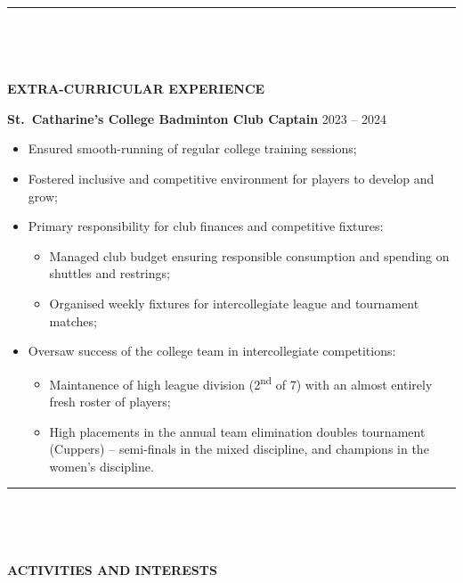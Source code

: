 \documentclass[
  11pt,
  a4paper,
]{article}
\providecommand{\tightlist}{%
  \setlength{\itemsep}{0pt}\setlength{\parskip}{0pt}}
\newcommand{\itemspace}{0.8ex}
\newcommand{\ruledheader}[2]{%
\begingroup
\setlength{\fboxsep}{0pt}%
\colorbox{#1}{%
\parbox[b][1.2ex][t]{35mm}{\begin{tiny}\ \end{tiny}}}%
\parbox[b][1.2ex][t]{5mm}{\begin{tiny}\ \end{tiny}}%
\uppercase{\textbf{#2}}
\endgroup}
\begin{document}
\pagebreak

\begin{Large}

\vspace{-1.5ex}\rule{\textwidth}{0.8pt}\vspace{2ex}

\ruledheader{cyan!50!teal}{Extra-curricular experience}\end{Large}

\vspace{\itemspace}

\textbf{St.~Catharine’s College Badminton Club Captain} \textbar{} 2023
– 2024

\begin{itemize}
\tightlist
\item
  Ensured smooth-running of regular college training sessions;
\item
  Fostered inclusive and competitive environment for players to develop
  and grow;
\item
  Primary responsibility for club finances and competitive fixtures:

  \begin{itemize}
  \tightlist
  \item
    Managed club budget ensuring responsible consumption and spending on
    shuttles and restrings;
  \item
    Organised weekly fixtures for intercollegiate league and tournament
    matches;
  \end{itemize}
\item
  Oversaw success of the college team in intercollegiate competitions:

  \begin{itemize}
  \tightlist
  \item
    Maintanence of high league division (2\textsuperscript{nd} of 7)
    with an almost entirely fresh roster of players;
  \item
    High placements in the annual team elimination doubles tournament
    (Cuppers) – semi-finals in the mixed discipline, and champions in
    the women’s discipline.
  \end{itemize}
\end{itemize}

\begin{Large}

\vspace{-1.5ex}\rule{\textwidth}{0.8pt}\vspace{2ex}

\ruledheader{cyan!50!teal}{Activities and Interests}\end{Large}
\end{document}
